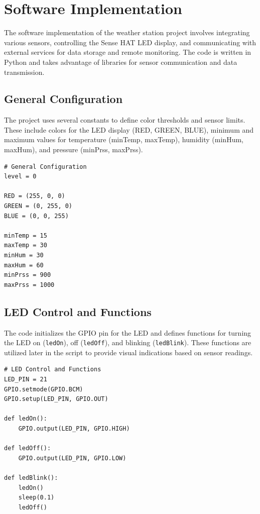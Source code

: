 \documentclass[titlepage]{article}
\begin{document}
\newpage

\section{Software Implementation}

The software implementation of the weather station project involves integrating various sensors, controlling the Sense HAT LED display, and communicating with external services for data storage and remote monitoring. The code is written in Python and takes advantage of libraries for sensor communication and data transmission.

\subsection{General Configuration}

The project uses several constants to define color thresholds and sensor limits. These include colors for the LED display (RED, GREEN, BLUE), minimum and maximum values for temperature (minTemp, maxTemp), humidity (minHum, maxHum), and pressure (minPrss, maxPrss).

\begin{verbatim}
# General Configuration
level = 0

RED = (255, 0, 0)
GREEN = (0, 255, 0)
BLUE = (0, 0, 255)

minTemp = 15
maxTemp = 30
minHum = 30
maxHum = 60
minPrss = 900
maxPrss = 1000
\end{verbatim}

\subsection{LED Control and Functions}

The code initializes the GPIO pin for the LED and defines functions for turning the LED on (\texttt{ledOn}), off (\texttt{ledOff}), and blinking (\texttt{ledBlink}). These functions are utilized later in the script to provide visual indications based on sensor readings.

\begin{verbatim}
# LED Control and Functions
LED_PIN = 21
GPIO.setmode(GPIO.BCM)
GPIO.setup(LED_PIN, GPIO.OUT)

def ledOn():
    GPIO.output(LED_PIN, GPIO.HIGH)

def ledOff():
    GPIO.output(LED_PIN, GPIO.LOW)

def ledBlink():
    ledOn()
    sleep(0.1)
    ledOff()
\end{verbatim}
\end{document}
